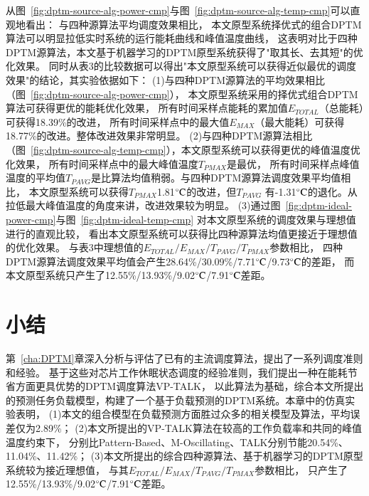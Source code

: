 从图~\ref{fig:dptm-source-alg-power-cmp}与图~\ref{fig:dptm-source-alg-temp-cmp}可以直观地看出： 与四种源算法平均调度效果相比， 本文原型系统择优式的组合DPTM算法可以明显拉低实时系统的运行能耗曲线和峰值温度曲线， 这表明对比于四种DPTM源算法，本文基于机器学习的DPTM原型系统获得了"取其长、去其短"的优化效果。 同时从表3的比较数据可以得出"本文原型系统可以获得近似最优的调度效果"的结论，其实验依据如下：
(1)与四种DPTM源算法的平均效果相比（图~\ref{fig:dptm-source-alg-power-cmp}）， 本文原型系统采用的择优式组合DPTM算法可获得更优的能耗优化效果， 所有时间采样点能耗的累加值$E_{TOTAL}$（总能耗）可获得18.39\%的改进， 所有时间采样点中的最大值$E_{MAX}$（最大能耗）可获得18.77\%的改进。整体改进效果非常明显。
(2)与四种DPTM源算法相比（图~\ref{fig:dptm-source-alg-temp-cmp}），本文原型系统可以获得更优的峰值温度优化效果， 所有时间采样点中的最大峰值温度$T_{PMAX}$是最优， 所有时间采样点峰值温度的平均值$T_{PAVG}$是比算法均值稍弱。与四种DPTM源算法调度效果平均值相比， 本文原型系统可以获得$T_{PMAX}$1.81$\celsius$的改进，但$T_{PAVG}$ 有-1.31$\celsius$的退化。从拉低最大峰值温度的角度来讲，改进效果较为明显。
(3)通过图~\ref{fig:dptm-ideal-power-cmp}与图~\ref{fig:dptm-ideal-temp-cmp} 对本文原型系统的调度效果与理想值进行的直观比较， 看出本文原型系统可以获得比四种源算法均值更接近于理想值的优化效果。 与表3中理想值的$E_{TOTAL}/E_{MAX}/T_{PAVG}/T_{PMAX}$参数相比， 四种DPTM源算法调度效果平均值会产生28.64\%/30.09\%/7.71$\celsius$/9.73$\celsius$的差距， 而本文原型系统只产生了12.55\%/13.93\%/9.02$\celsius$/7.91$\celsius$差距。


\section{小结}
第~\ref{cha:DPTM}章深入分析与评估了已有的主流调度算法，提出了一系列调度准则和经验。 基于这些对芯片工作休眠状态调度的经验准则，我们提出一种在能耗节省方面更具优势的DPTM调度算法VP-TALK， 以此算法为基础，综合本文所提出的预测任务负载模型，构建了一个基于负载预测的DPTM系统。本章中的仿真实验表明， (1)本文的组合模型在负载预测方面胜过众多的相关模型及算法，平均误差仅为2.89\%； (2)本文所提出的VP-TALK算法在较高的工作负载率和共同的峰值温度约束下， 分别比Pattern-Based、M-Oscillating、TALK分别节能20.54\%、11.04\%、11.42\%； (3)本文所提出的综合四种源算法、基于机器学习的DPTM原型系统较为接近理想值， 与其$E_{TOTAL}/E_{MAX}/T_{PAVG}/T_{PMAX}$参数相比， 只产生了12.55\%/13.93\%/9.02$\celsius$/7.91$\celsius$差距。

